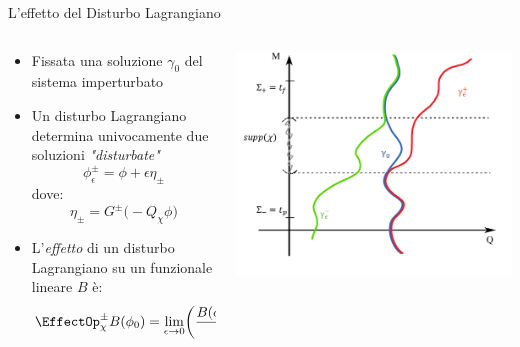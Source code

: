 \documentclass[8pt,handout]{beamer}
\begin{document}
		\begin{frame}{L'effetto del Disturbo Lagrangiano}
		  	\begin{columns}[T]
    			\begin{column}{.5\textwidth}
						\begin{itemize}
							\item Fissata una soluzione $\gamma_0$ del sistema imperturbato 
							\item Un disturbo Lagrangiano determina univocamente due soluzioni \emph{"disturbate"}
								\begin{displaymath}
									\phi^\pm_\epsilon = \phi + \epsilon \eta_\pm
								\end{displaymath}
								dove:
								 \begin{displaymath}
   									\eta_\pm = G^\pm \big( - Q_\chi \phi \big)
   								\end{displaymath}
   						\item L'\emph{effetto} di un disturbo Lagrangiano su un funzionale lineare $B$ è:
   							\begin{displaymath}		
								\EffectOp_\chi^\pm B ( \phi_0) 
								= \lim_{\epsilon \rightarrow 0}
								 \biggr( \frac{B(\phi_\epsilon^\pm) - B (\phi_0)}{\epsilon} \biggr)
   							\end{displaymath}			
						\end{itemize}
    			\end{column}
    		   	\begin{column}{.5\textwidth}
							\vfill
							\includegraphics[width=\textwidth]{Pictures/AdvRetSol}
							\vfill
    			\end{column}
    		\end{columns}
	\end{frame}
\end{document}
